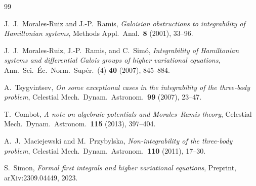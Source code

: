 \documentclass[11pt,a4paper]{article}
\theoremstyle{remark}
\begin{document}
\begin{thebibliography}{99}

J.~J.~Morales-Ruiz and J.-P.~Ramis,
\emph{Galoisian obstructions to integrability of Hamiltonian
systems},
Methods Appl.\ Anal.\ \textbf{8} (2001), 33--96.

J.~J.~Morales-Ruiz, J.-P.~Ramis, and C.~Sim\'{o},
\emph{Integrability of Hamiltonian systems and differential
Galois groups of higher variational equations},
Ann.\ Sci.\ \'{E}c.\ Norm.\ Sup\'{e}r.\ (4) \textbf{40} (2007),
845--884.

A.~Tsygvintsev,
\emph{On some exceptional cases in the integrability of the
three-body problem},
Celestial Mech.\ Dynam.\ Astronom.\ \textbf{99} (2007), 23--47.

T.~Combot,
\emph{A note on algebraic potentials and Morales--Ramis theory},
Celestial Mech.\ Dynam.\ Astronom.\ \textbf{115} (2013), 397--404.

A.~J.~Maciejewski and M.~Przybylska,
\emph{Non-integrability of the three-body problem},
Celestial Mech.\ Dynam.\ Astronom.\ \textbf{110} (2011), 17--30.

S.~Simon,
\emph{Formal first integrals and higher variational equations},
Preprint, arXiv:2309.04449, 2023.

\end{thebibliography}
\end{document}
